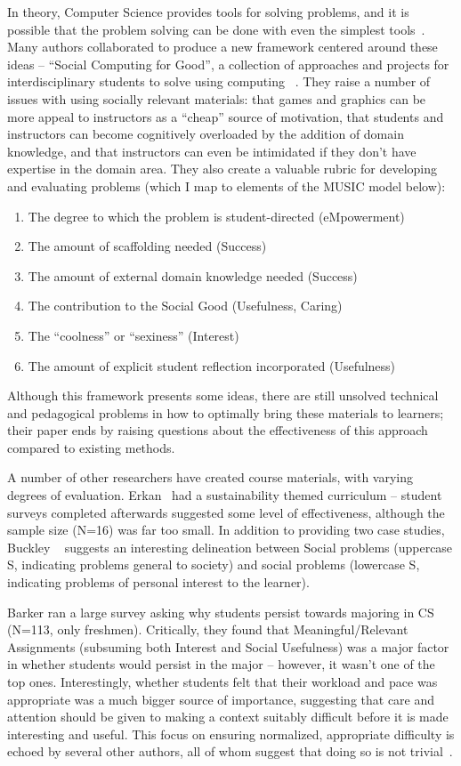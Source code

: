 In theory, Computer Science provides tools for solving problems, and it is possible that the problem solving can be done with even the simplest tools~\cite{Layman:2007, Social-good}.
Many authors collaborated to produce a new framework centered around these ideas -- ``Social Computing for Good'', a collection of approaches and projects for interdisciplinary students to solve using computing ~\cite{Social-good}.
They raise a number of issues with using socially relevant materials: that games and graphics can be more appeal to instructors as a ``cheap'' source of motivation, that students and instructors can become cognitively overloaded by the addition of domain knowledge, and that instructors can even be intimidated if they don't have expertise in the domain area.
They also create a valuable rubric for developing and evaluating problems (which I map to elements of the MUSIC model below):
\begin{enumerate}
	\item The degree to which the problem is student-directed (eMpowerment)
	\item The amount of scaffolding needed (Success)
	\item The amount of external domain knowledge needed (Success)
	\item The contribution to the Social Good (Usefulness, Caring)
	\item The ``coolness'' or ``sexiness'' (Interest)
	\item The amount of explicit student reflection incorporated (Usefulness)
\end{enumerate}
Although this framework presents some ideas, there are still unsolved technical and pedagogical problems in how to optimally bring these materials to learners; their paper ends by raising questions about the effectiveness of this approach compared to existing methods.

A number of other researchers have created course materials, with varying degrees of evaluation.
Erkan~\cite{Erkan:2012} had a sustainability themed curriculum -- student surveys completed afterwards suggested some level of effectiveness, although the sample size (N=16) was far too small.
In addition to providing two case studies, Buckley ~\cite{Buckley:2008} suggests an interesting delineation between Social problems (uppercase S, indicating problems general to society) and social problems (lowercase S, indicating problems of personal interest to the learner).

Barker ran a large survey asking why students persist towards majoring in CS~\cite{Barker:2009} (N=113, only freshmen).
Critically, they found that Meaningful/Relevant Assignments (subsuming both Interest and Social Usefulness) was a major factor in whether students would persist in the major -- however, it wasn't one of the top ones.
Interestingly, whether students felt that their workload and pace was appropriate was a much bigger source of importance, suggesting that care and attention should be given to making a context suitably difficult before it is made interesting and useful.
This focus on ensuring normalized, appropriate difficulty is echoed by several other authors, all of whom suggest that doing so is not trivial~\cite{Rader:2011, Stevenson:2006}.

